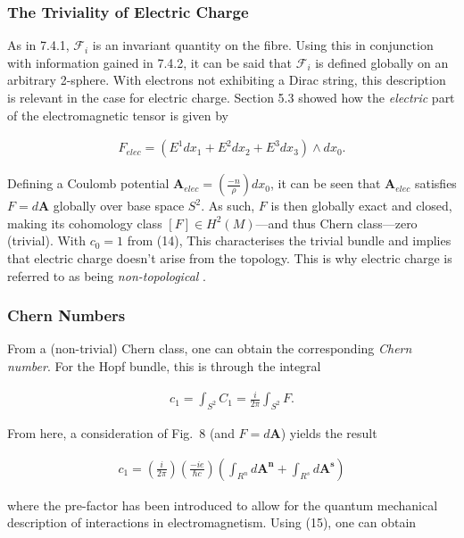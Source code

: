 \documentclass[fleqn, twocolumn, 10pt]{article}
\begin{document}

\subsubsection{The Triviality of Electric Charge}

As in 7.4.1, $\mathcal{F}_i$ is an invariant quantity on the fibre. Using this in conjunction with information gained in 7.4.2, it can be said that $\mathcal{F}_i$ is defined globally on an arbitrary 2-sphere. With electrons not exhibiting a Dirac string, this description is relevant in the case for electric charge. Section 5.3 showed how the \textit{electric} part of the electromagnetic tensor is given by

\begin{ceqn}
\begin{align*}
F_{elec} = (E^1dx_1 + E^2dx_2 + E^3dx_3)\land dx_0.
\end{align*}
\end{ceqn}
Defining a Coulomb potential $\mathbf{A}_{elec} = \left(\frac{-n}{\rho}\right)dx_0$, it can be seen that $\mathbf{A}_{elec}$ satisfies $F = d\mathbf{A}$ globally over base space $S^2$. As such, $F$ is then globally exact and closed, making its cohomology class $[F] \in H^2(M)$---and thus Chern class---zero (trivial). With $c_0 = 1$ from (14), This characterises the trivial bundle and implies that electric charge doesn't arise from the topology. This is why electric charge is referred to as being \textit{non-topological} \cite{naber1997topology}.


\subsubsection{Chern Numbers}

From a (non-trivial) Chern class, one can obtain the corresponding \textit{Chern number}. For the Hopf bundle, this is through the integral 

\begin{ceqn}
\begin{align*}
c_1 = \int_{S^2} C_1 = \frac{i}{2\pi}\int_{S^2} F.
\end{align*}
\end{ceqn}
From here, a consideration of Fig.~8 (and $F = d\mathbf{A}$) yields the result

\begin{ceqn}
\begin{align*}
c_1 = \left(\frac{i}{2\pi}\right) \left(\frac{-ie}{\hbar c}\right) \left(\int_{R^n} d\mathbf{A^n} + \int_{R^s} d\mathbf{A^s}\right)
\end{align*}
\end{ceqn}
where the pre-factor has been introduced to allow for the quantum mechanical description of interactions in electromagnetism. Using (15), one can obtain
\end{document}
